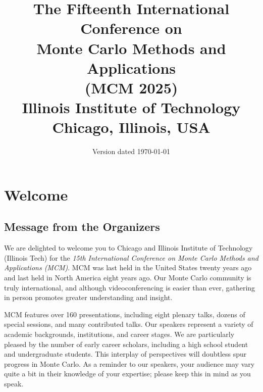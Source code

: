 \title{The Fifteenth International Conference on \\
	Monte Carlo Methods and Applications \\
	(MCM 2025) \\[3ex]
	\Large{Illinois Institute of Technology} \\
	\large{Chicago, Illinois, USA}}
\date{Version dated \today}
\maketitle


\tableofcontents


\chapter{Welcome}

\section{Message from the Organizers} \label{org_com}


We are delighted to welcome you to Chicago and Illinois Institute of Technology (Illinois Tech) for the \emph{15th International Conference on Monte Carlo Methods and Applications (MCM)}. MCM was last held in the United States twenty years ago and last held in North America eight years ago.  Our Monte Carlo community is truly international, and although videoconferencing is easier than ever, gathering in person promotes greater understanding and insight.

MCM features over 160 presentations, including eight plenary talks,  dozens of special sessions, and many contributed talks.  Our speakers represent a variety of academic backgrounds, institutions, and career stages.  We are particularly pleased by the number of early career scholars, including a high school student and  undergraduate students.  This interplay of perspectives will doubtless spur progress in Monte Carlo.  As a reminder to our speakers, your audience may vary quite a bit in their knowledge of your expertise; please keep this in mind as you speak.

